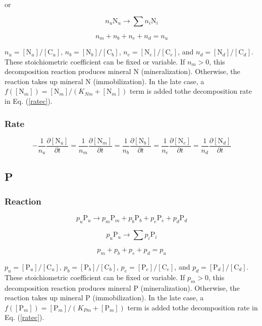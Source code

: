 \documentclass[12pt, a4paper]{article}
\begin{document}
or

\begin{equation}
n_u \text{N}_u \rightarrow \sum n_i \text{N}_i
\end{equation}

\begin{equation}
n_m + n_b + n_e + n_d = n_u
\end{equation}

$n_u = [\text{N}_u]/[\text{C}_u]$, $n_b = [\text{N}_b]/[\text{C}_b]$, $n_e = [\text{N}_e]/[\text{C}_e]$, and $n_d = [\text{N}_d]/[\text{C}_d]$. These stoichiometric coefficient can be fixed or variable. If $n_m > 0$, this decomposition reaction produces mineral N (mineralization). Otherwise, the reaction takes up mineral N (immobilization). In the late case, a $f([\text{N}_m])=[\text{N}_m]/(K_{Nm}+[\text{N}_m])$ term is added tothe decomposition rate in Eq. (\ref{ratec}).
\subsubsection{Rate}
\begin{equation}
-\frac{1}{n_u}\frac{\partial [\text{N}_u]}{\partial t} = \frac{1}{n_m}\frac{\partial [\text{N}_m]}{\partial t} = \frac{1}{n_b} \frac{\partial [\text{N}_b]}{\partial t} = \frac{1}{n_e} \frac{\partial [\text{N}_e]}{\partial t} = \frac{1}{n_d}\frac{\partial [\text{N}_d]}{\partial t}
\end{equation}

\subsection{P}
\subsubsection{Reaction}
\begin{equation}
p_u \text{P}_u \rightarrow p_m \text{P}_m + p_b \text{P}_b + p_e \text{P}_e + p_d \text{P}_d
\end{equation}

\begin{equation}
p_u \text{P}_u \rightarrow \sum p_i \text{P}_i
\end{equation}

\begin{equation}
p_m + p_b + p_e + p_d = p_u
\end{equation}

$p_u = [\text{P}_u]/[\text{C}_u]$, $p_b = [\text{P}_b]/[\text{C}_b]$, $p_e = [\text{P}_e]/[\text{C}_e]$, and $p_d = [\text{P}_d]/[\text{C}_d]$. These stoichiometric coefficient can be fixed or variable. If $p_m > 0$, this decomposition reaction produces mineral P (mineralization). Otherwise, the reaction takes up mineral P (immobilization). In the late case, a $f([\text{P}_m])=[\text{P}_m]/(K_{Pm}+[\text{P}_m])$ term is added tothe decomposition rate in Eq. (\ref{ratec}).
\end{document}
